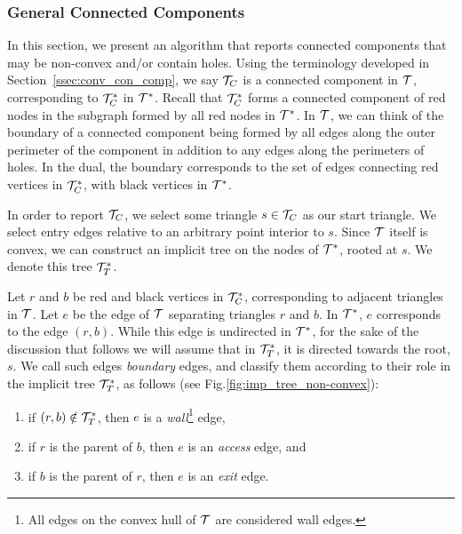 {  %
  \subsubsection{General Connected Components}\label{ssec:gen_con_comp}

  In this section, we present an algorithm that reports connected components 
  that may be non-convex and/or contain holes.
  Using the terminology developed in Section~\ref{ssec:conv_con_comp}, we 
  say ${\mathcal{T}}_C$ is a connected component in $\mathcal{T}$, corresponding 
  to ${\mathcal{T}}_C^*$ in $\mathcal{T}^*$. 
  Recall that ${\mathcal{T}}_C^*$ forms a connected component of red nodes 
  in the subgraph formed by all red nodes in $\mathcal{T}^*$.
  In $\mathcal{T}$, we can think of the boundary of a connected component being 
  formed by all edges along the outer perimeter of the component
  in addition to any edges along the perimeters of holes. 
  In the dual, the boundary corresponds to the set of edges connecting 
  red vertices in ${\mathcal{T}}_C^*$, with black vertices in $\mathcal{T}^*$. 

  In order to report ${\mathcal{T}}_C$, we select some triangle $s \in {\mathcal{T}}_C$ as our
  start triangle. 
  We select entry edges relative to an arbitrary point interior to $s$.
  Since $\mathcal{T}$ itself is convex, we can construct an implicit tree
  on the nodes of $\mathcal{T}^*$, rooted at $s$.
  We denote this tree $\mathcal{T}^*_T$.
  
  Let $r$ and $b$ be red and black vertices in
  ${\mathcal{T}}_C^*$, corresponding to adjacent triangles in $\mathcal{T}$.
  Let $e$ be the edge of $\mathcal{T}$ separating triangles $r$ and $b$.
  In $\mathcal{T}^*$, $e$ corresponds to the edge $(r,b)$.
  While this edge is undirected in $\mathcal{T}^*$, for the sake of the
  discussion that follows we will assume that in $\mathcal{T}^*_T$, it
  is directed towards the root, $s$.
  We call such edges \emph{boundary} edges, and classify them according
  to their role in the implicit tree $\mathcal{T}^*_T$, as follows 
  (see Fig.\ref{fig:imp_tree_non-convex}):
  
  \begin{enumerate}
    \item if $(r,b) \notin \mathcal{T}^*_T$, then $e$ is a \emph{wall}\footnote{
    All edges on the convex hull of $\mathcal{T}$ are considered wall edges.} edge, 
    \item if $r$ is the parent of $b$, then $e$ is an \emph{access} edge, and 
    \item if $b$ is the parent of $r$, then $e$ is an \emph{exit} edge.
  \end{enumerate}

}
